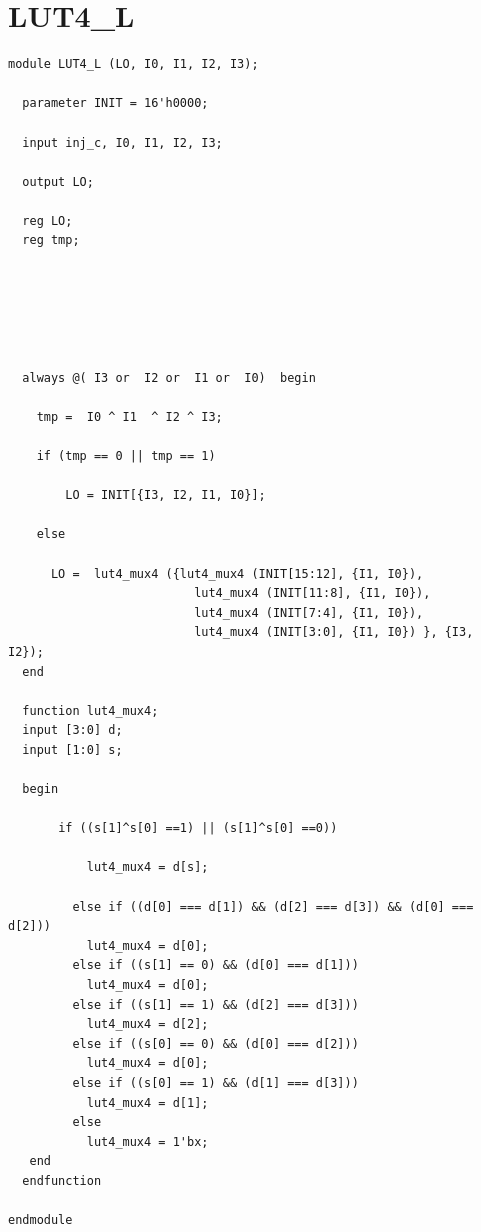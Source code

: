 \documentclass[a4paper,openright,12pt]{report}
\begin{document}
\section{LUT4\_L}
\begin{lstlisting}
module LUT4_L (LO, I0, I1, I2, I3);

  parameter INIT = 16'h0000;

  input inj_c, I0, I1, I2, I3;

  output LO;

  reg LO;
  reg tmp;

  
 
  

  
  always @( I3 or  I2 or  I1 or  I0)  begin
 
    tmp =  I0 ^ I1  ^ I2 ^ I3;

    if (tmp == 0 || tmp == 1)

        LO = INIT[{I3, I2, I1, I0}];

    else 
    
      LO =  lut4_mux4 ({lut4_mux4 (INIT[15:12], {I1, I0}),
                          lut4_mux4 (INIT[11:8], {I1, I0}),
                          lut4_mux4 (INIT[7:4], {I1, I0}),
                          lut4_mux4 (INIT[3:0], {I1, I0}) }, {I3, I2});
  end

  function lut4_mux4;
  input [3:0] d;
  input [1:0] s;
   
  begin

       if ((s[1]^s[0] ==1) || (s[1]^s[0] ==0))
           
           lut4_mux4 = d[s];

         else if ((d[0] === d[1]) && (d[2] === d[3]) && (d[0] === d[2])) 
           lut4_mux4 = d[0];
         else if ((s[1] == 0) && (d[0] === d[1]))
           lut4_mux4 = d[0];
         else if ((s[1] == 1) && (d[2] === d[3])) 
           lut4_mux4 = d[2];
         else if ((s[0] == 0) && (d[0] === d[2])) 
           lut4_mux4 = d[0];
         else if ((s[0] == 1) && (d[1] === d[3]))
           lut4_mux4 = d[1];
         else
           lut4_mux4 = 1'bx;
   end
  endfunction

endmodule


\end{lstlisting}
\end{document}
